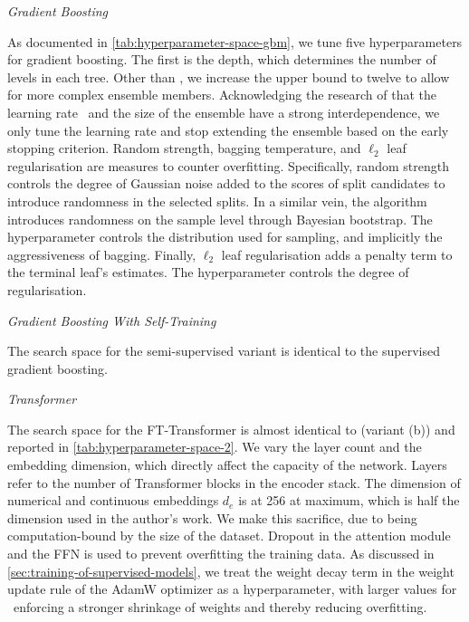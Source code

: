 \emph{Gradient Boosting}

As documented in \cref{tab:hyperparameter-space-gbm}, we tune five hyperparameters for gradient boosting. The first is the depth, which determines the number of levels in each tree. Other than \textcite[][]{gorishniyRevisitingDeepLearning2021}, we increase the upper bound to twelve to allow for more complex ensemble members. Acknowledging the research of \textcite[][14]{friedmanGreedyFunctionApproximation2001} that the learning rate \eta~and the size of the ensemble have a strong interdependence, we only tune the learning rate and stop extending the ensemble based on the early stopping criterion. Random strength, bagging temperature, and $\ell_2$ leaf regularisation are measures to counter overfitting. Specifically, random strength controls the degree of Gaussian noise added to the scores of split candidates to introduce randomness in the selected splits. In a similar vein, the algorithm introduces randomness on the sample level through Bayesian bootstrap. The hyperparameter controls the distribution used for sampling, and implicitly the aggressiveness of bagging. Finally, $\ell_2$ leaf regularisation adds a penalty term to the terminal leaf's estimates. The hyperparameter controls the degree of regularisation.

\emph{Gradient Boosting With Self-Training}

The search space for the semi-supervised variant is identical to the supervised gradient boosting.

\emph{Transformer}

The search space for the FT-Transformer is almost identical to \textcite[][18]{gorishniyRevisitingDeepLearning2021} (variant (b)) and reported in \cref{tab:hyperparameter-space-2}. We vary the layer count and the embedding dimension, which directly affect the capacity of the network. Layers refer to the number of Transformer blocks in the encoder stack. The dimension of numerical and continuous embeddings $d_e$ is at \num{256} at maximum, which is half the dimension used in the author's work. We make this sacrifice, due to being computation-bound by the size of the dataset. Dropout \autocite[][1930]{srivastavaDropoutSimpleWay} in the attention module and the \gls{FFN} is used to prevent overfitting the training data. As discussed in \cref{sec:training-of-supervised-models}, we treat the weight decay term in the weight update rule of the AdamW optimizer as a hyperparameter, with larger values for \lambda~enforcing a stronger shrinkage of weights and thereby reducing overfitting.

